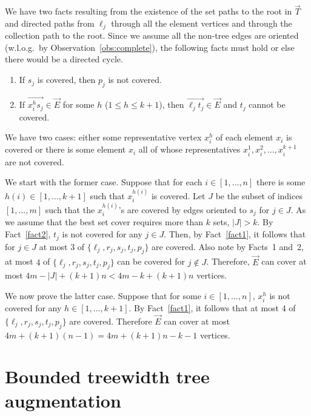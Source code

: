\documentclass{article}
\begin{document}
We have two facts resulting from the existence of the set paths to the
root in $\overrightarrow T$ and directed paths from $\ell_j$ through
all the element vertices and through the collection path to the root.
Since we assume all the non-tree edges are oriented (w.l.o.g.\ by
Observation~\ref{obs:complete}), the following facts must hold or else
there would be a directed cycle.
\begin{enumerate}[{Fact} 1]
\item If $s_j$ is covered, then $p_j$ is not covered. \label{fact1}

\item If $\overrightarrow{x_i^hs_j} \in \overrightarrow E$ for some
  $h$ ($1\le h\le k+1$), then $\overrightarrow{\ell_jt_j} \in
  \overrightarrow E$ and $t_j$ cannot be covered. \label{fact2}
\end{enumerate}

We have two cases: either some representative vertex $x_i^h$ of each 
element $x_i$ is
covered or there is some element $x_i$ all of whose representatives
$x_i^1, x_i^2,\ldots, x_i^{k+1}$ are not covered.

We start with the former case.  Suppose that for each $i\in [1, \ldots
,n]$ there is some $h(i)\in [1,\ldots ,k+1]$ such that $x_i^{h(i)}$ is
covered.  Let $J$ be the subset of indices $[1,\ldots,m]$ such that
the $x_i^{h(i)}$'s are covered by edges oriented to $s_j$ for $j \in
J$.  As we assume that the best set cover requires more than $k$ sets,
$|J| > k$.  By Fact~\ref{fact2}, $t_j$ is not covered for any $j \in
J$.  Then, by Fact~\ref{fact1}, it follows that for $j\in J$ at most 3
of $\{\ell_j, r_j, s_j, t_j, p_j\}$ are covered.  Also note by Facts~1 and~2, at most $4$ of $\{\ell_j, r_j, s_j, t_j, p_j\}$ can be
covered for $j\not\in J$.  Therefore, $\overrightarrow E$ can cover at
most $4m-|J|+(k+1)n < 4m-k+(k+1)n$ vertices.

We now prove the latter case.  Suppose that for some $i \in
[1,\ldots,n]$, $x_i^h$ is not covered for any $h \in [1,\ldots, k+1]$.
By Fact~\ref{fact1}, it follows that at most 4 of $\{\ell_j, r_j, s_j,
t_j, p_j\}$ are covered.  Therefore $\overrightarrow E$ can cover at
most $4m+(k+1)(n-1) = 4m+(k+1)n-k-1$ vertices.




\section{Bounded treewidth {\sc tree augmentation}}
\label{sec:boundedtw}
\end{document}
